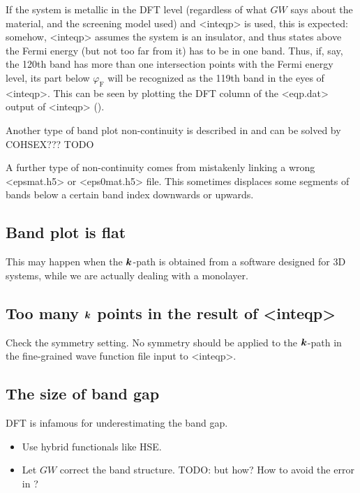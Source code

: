 \documentclass[hyperref, a4paper, 12pt]{report}
\def\texttt#1{<#1>}%
\newcommand{\shortcode}[1]{\texttt{#1}}
\begin{document}
If the system is metallic in the DFT level 
(regardless of what $GW$ says about the material, 
and the screening model used)
and \shortcode{inteqp} is used, 
this is expected:
somehow, \shortcode{inteqp} assumes the system is an insulator,
and thus states above the Fermi energy (but not too far from it)
has to be in one band.
Thus, if, say, the 120th band has more than one intersection points 
with the Fermi energy level,
its part below $\varphi_{\text{F}}$ will be recognized as the 119th band
in the eyes of \shortcode{inteqp}.
This can be seen by plotting the DFT column of the \shortcode{eqp.dat} output of \shortcode{inteqp}
().

Another type of band plot non-continuity is described in \cite{berger2020potential} 
and can be solved by COHSEX??? TODO

A further type of non-continuity comes from mistakenly linking a wrong \shortcode{epsmat.h5} 
or \shortcode{eps0mat.h5} file.
This sometimes displaces some segments of bands below a certain band index downwards or upwards.

\subsection{Band plot is flat}

This may happen when the $\vb*{k}$-path is obtained 
from a software designed for 3D systems, 
while we are actually dealing with a monolayer.

\subsection{Too many $\vb*{k}$ points in the result of \shortcode{inteqp}}

Check the symmetry setting. No symmetry should be applied to the $\vb*{k}$-path in the fine-grained wave function file input to \shortcode{inteqp}.

\subsection{The size of band gap}\label{sec:band-gap-problem}

DFT is infamous for underestimating the band gap.

\begin{itemize}
    \item Use hybrid functionals like HSE.
    \item Let $GW$ correct the band structure. TODO: but how? How to avoid the error in ?
\end{itemize}
\end{document}
